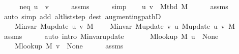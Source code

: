 \begin{isabellebody}
%
\isadeliminvisible
\isanewline
%
\endisadeliminvisible
%
\isadelimproof
%
\endisadelimproof
%
\isatagproof
{}\isamarkupfalse%
\ {\isacharminus}{\kern0pt}\isanewline
\ \ \isamarkupfalse%
\ neq{\isacharcolon}{\kern0pt}\ {\isachardoublequoteopen}u\ {\isasymnoteq}\ v{\isachardoublequoteclose}\isanewline
\ \ \ \ \isamarkupfalse%
\ assms{\isacharparenleft}{\kern0pt}{}{\isacharparenright}{\kern0pt}\isanewline
\ \ \ \ \isamarkupfalse%
\ simp\isanewline
\ \ \isamarkupfalse%
\ {\isachardoublequoteopen}{\isacharbraceleft}{\kern0pt}u{\isacharcomma}{\kern0pt}\ v{\isacharbraceright}{\kern0pt}\ {\isasymnotin}\ M{\isacharunderscore}{\kern0pt}tbd\ M{\isachardoublequoteclose}\isanewline
\ \ \ \ \isamarkupfalse%
\ assms{\isacharparenleft}{\kern0pt}{}{\isacharparenright}{\kern0pt}\isanewline
\ \ \ \ \isamarkupfalse%
\ {\isacharparenleft}{\kern0pt}auto\ simp\ add{\isacharcolon}{\kern0pt}\ alt{\isacharunderscore}{\kern0pt}list{\isacharunderscore}{\kern0pt}step\ dest{\isacharcolon}{\kern0pt}\ augmenting{\isacharunderscore}{\kern0pt}pathD{\isacharparenleft}{\kern0pt}{}{\isacharparenright}{\kern0pt}{\isacharparenright}{\kern0pt}\isanewline
\ \ \isamarkupfalse%
\isanewline
\ \ \ \ {\isachardoublequoteopen}M{\isachardot}{\kern0pt}invar\ {\isacharparenleft}{\kern0pt}M{\isacharunderscore}{\kern0pt}update\ u\ v\ M{\isacharparenright}{\kern0pt}{\isachardoublequoteclose}\isanewline
\ \ \ \ {\isachardoublequoteopen}M{\isachardot}{\kern0pt}invar\ {\isacharparenleft}{\kern0pt}M{\isacharunderscore}{\kern0pt}update\ v\ u\ {\isacharparenleft}{\kern0pt}M{\isacharunderscore}{\kern0pt}update\ u\ v\ M{\isacharparenright}{\kern0pt}{\isacharparenright}{\kern0pt}{\isachardoublequoteclose}\isanewline
\ \ \ \ \isamarkupfalse%
\ assms{\isacharparenleft}{\kern0pt}{}{\isacharparenright}{\kern0pt}\isanewline
\ \ \ \ \isamarkupfalse%
\ {\isacharparenleft}{\kern0pt}auto\ intro{\isacharcolon}{\kern0pt}\ M{\isachardot}{\kern0pt}invar{\isacharunderscore}{\kern0pt}update{\isacharparenright}{\kern0pt}\isanewline
\ \ \isamarkupfalse%
\isanewline
\ \ \ \ {\isachardoublequoteopen}M{\isacharunderscore}{\kern0pt}lookup\ M\ u\ {\isacharequal}{\kern0pt}\ None{\isachardoublequoteclose}\isanewline
\ \ \ \ {\isachardoublequoteopen}M{\isacharunderscore}{\kern0pt}lookup\ M\ v\ {\isacharequal}{\kern0pt}\ None{\isachardoublequoteclose}\isanewline
\ \ \ \ \isamarkupfalse%
\ assms{\isacharparenleft}{\kern0pt}{}{\isacharcomma}{\kern0pt}\ {}{\isacharparenright}{\kern0pt}\isanewline

\end{isabellebody}

